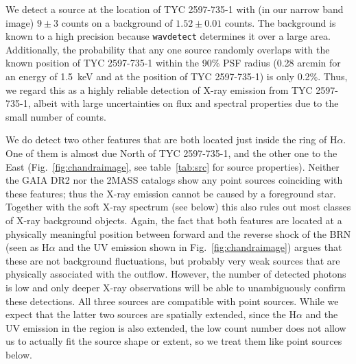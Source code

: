 \documentclass[linenumbers]{aastex631}
\begin{document}
We detect a source at the location of TYC 2597-735-1 with (in our narrow band image) $9\pm3$ counts on a background of $1.52\pm0.01$ counts. The background is known to a high precision because \texttt{wavdetect} determines it over a large area. Additionally, the probability that any one source randomly overlaps with the known position of TYC 2597-735-1 within the 90\% PSF radius (0.28 arcmin for an energy of 1.5~keV and at the position of TYC 2597-735-1) is only 0.2\%. Thus, we regard this as a highly reliable detection of X-ray emission from TYC 2597-735-1, albeit with large uncertainties on flux and spectral properties due to the small number of counts.

We do detect two other features that are both located just inside the ring of H$\alpha$. One of them is almost due North of TYC 2597-735-1, and the other one to the East (Fig.~\ref{fig:chandraimage}, see table~\ref{tab:src} for source properties).  Neither the GAIA DR2 \citep{2016A&A...595A...1G,2018A&A...616A...1G} nor the 2MASS \citep{2006AJ....131.1163S} catalogs show any point sources coinciding with these features; thus the X-ray emission cannot be caused by a foreground star. Together with the soft X-ray spectrum (see below) this also rules out most classes of X-ray background objects. Again, the fact that both features are located at a physically meaningful position between forward and the reverse shock of the BRN (seen as H$\alpha$ and the UV emission shown in Fig.~\ref{fig:chandraimage}) argues that these are not background fluctuations, but probably very weak sources that are physically associated with the outflow. However, the number of detected photons is low and only deeper X-ray observations will be able to unambiguously confirm these detections.
All three sources are compatible with point sources. While we expect that the latter two sources are spatially extended, since the H$\alpha$ and the UV emission in the region is also extended, the low count number does not allow us to actually fit the source shape or extent, so we treat them like point sources below.
\end{document}
